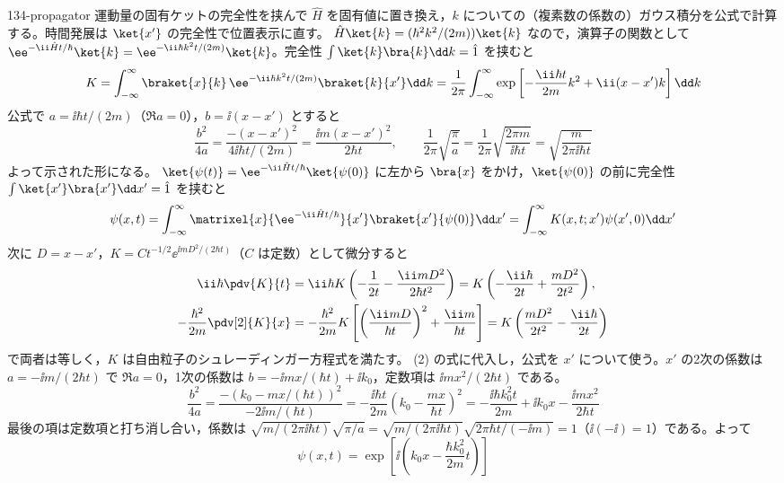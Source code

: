 \documentclass[uplatex,dvipdfmx,a4paper,11pt]{jsarticle}
\begin{document}
\begin{kaisetsu}{134-propagator}
\houshin 運動量の固有ケットの完全性を挟んで $\hat{H}$ を固有値に置き換え，$k$ についての（複素数の係数の）ガウス積分を公式で計算する。時間発展は $\ket{x'}$ の完全性で位置表示に直す。
\keisan
{} $\hat{H}\ket{k}=(\hbar^{2}k^{2}/(2m))\ket{k}$ なので，演算子の関数として $\ee^{-\ii\hat{H}t/\hbar}\ket{k}=\ee^{-\ii\hbar k^{2}t/(2m)}\ket{k}$。完全性 $\int\ket{k}\bra{k}\dd k=\hat{1}$ を挟むと
\[ K=\int_{-\infty}^{\infty}\braket{x}{k}\,\ee^{-\ii\hbar k^{2}t/(2m)}\braket{k}{x'}\dd k=\frac{1}{2\pi}\int_{-\infty}^{\infty}\exp\left[-\frac{\ii\hbar t}{2m}k^{2}+\ii(x-x')k\right]\dd k \]
公式で $a=\ii\hbar t/(2m)$（$\Re a=0$），$b=\ii(x-x')$ とすると
\[ \frac{b^{2}}{4a}=\frac{-(x-x')^{2}}{4\ii\hbar t/(2m)}=\frac{\ii m(x-x')^{2}}{2\hbar t},\qquad \frac{1}{2\pi}\sqrt{\frac{\pi}{a}}=\frac{1}{2\pi}\sqrt{\frac{2\pi m}{\ii\hbar t}}=\sqrt{\frac{m}{2\pi\ii\hbar t}} \]
よって示された形になる。
 $\ket{\psi(t)}=\ee^{-\ii\hat{H}t/\hbar}\ket{\psi(0)}$ に左から $\bra{x}$ をかけ，$\ket{\psi(0)}$ の前に完全性 $\int\ket{x'}\bra{x'}\dd x'=\hat{1}$ を挟むと
\[ \psi(x,t)=\int_{-\infty}^{\infty}\matrixel{x}{\ee^{-\ii\hat{H}t/\hbar}}{x'}\braket{x'}{\psi(0)}\dd x'=\int_{-\infty}^{\infty}K(x,t;x')\psi(x',0)\dd x' \]
次に $D=x-x'$，$K=Ct^{-1/2}\ee^{\ii mD^{2}/(2\hbar t)}$（$C$ は定数）として微分すると
\begin{align*}
  \ii\hbar\pdv{K}{t}&=\ii\hbar K\left(-\frac{1}{2t}-\frac{\ii mD^{2}}{2\hbar t^{2}}\right)=K\left(-\frac{\ii\hbar}{2t}+\frac{mD^{2}}{2t^{2}}\right),\\
  -\frac{\hbar^{2}}{2m}\pdv[2]{K}{x}&=-\frac{\hbar^{2}}{2m}K\left[\left(\frac{\ii mD}{\hbar t}\right)^{2}+\frac{\ii m}{\hbar t}\right]=K\left(\frac{mD^{2}}{2t^{2}}-\frac{\ii\hbar}{2t}\right)
\end{align*}
で両者は等しく，$K$ は自由粒子のシュレーディンガー方程式を満たす。
 (2) の式に代入し，公式を $x'$ について使う。$x'$ の2次の係数は $a=-\ii m/(2\hbar t)$ で $\Re a=0$，1次の係数は $b=-\ii mx/(\hbar t)+\ii k_{0}$，定数項は $\ii mx^{2}/(2\hbar t)$ である。
\[ \frac{b^{2}}{4a}=\frac{-(k_{0}-mx/(\hbar t))^{2}}{-2\ii m/(\hbar t)}=-\frac{\ii\hbar t}{2m}\left(k_{0}-\frac{mx}{\hbar t}\right)^{2}=-\frac{\ii\hbar k_{0}^{2}t}{2m}+\ii k_{0}x-\frac{\ii mx^{2}}{2\hbar t} \]
最後の項は定数項と打ち消し合い，係数は $\sqrt{m/(2\pi\ii\hbar t)}\sqrt{\pi/a}=\sqrt{m/(2\pi\ii\hbar t)}\sqrt{2\pi\hbar t/(-\ii m)}=1$（$\ii(-\ii)=1$）である。よって
\[ \psi(x,t)=\exp\left[\ii\left(k_{0}x-\frac{\hbar k_{0}^{2}}{2m}t\right)\right] \]

\end{kaisetsu}
\end{document}
